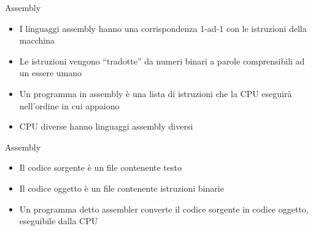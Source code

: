 \documentclass[xcolor=dvipsnames,handout]{beamer}
\begin{document}
\begin{frame}{Assembly}
  \vfill
  \begin{itemize}
    \item I linguaggi \alert{assembly} hanno una corrispondenza 1-ad-1
    con le istruzioni della macchina
    \vfill
    \item Le istruzioni vengono ``tradotte'' da numeri binari a parole comprensibili
    ad un essere umano
    \vfill
    \item Un programma in assembly è una lista di istruzioni che la CPU eseguirà
    nell'ordine in cui appaiono
    \vfill
    \item CPU diverse hanno linguaggi assembly diversi
  \end{itemize}
  \vfill
\end{frame}

\begin{frame}{Assembly}
  \vfill
  \begin{center}\end{center}
  \vfill
  \begin{itemize}
    \item Il \alert{codice sorgente} è un file contenente testo
    \vfill
    \item Il \alert{codice oggetto} è un file contenente istruzioni binarie
    \vfill
    \item Un programma detto \alert{assembler} converte il codice sorgente in codice
    oggetto, eseguibile dalla CPU
  \end{itemize}
  \vfill
\end{frame}
\end{document}
